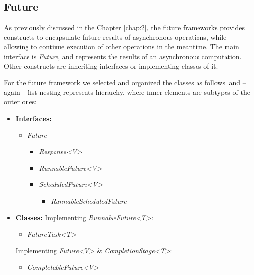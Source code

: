 \documentclass[]{usiinfthesis}
\begin{document}
\subsection{Future}
As previously discussed in the Chapter \ref{chap:2}, the future frameworks provides constructs to encapsulate future results of asynchronous operations, while allowing to continue execution of other operations in the meantime. The main interface is \textit{Future}, and represents the results of an asynchronous computation. Other constructs are inheriting interfaces or implementing classes of it.

\noindent
For the future framework we selected and organized the classes as follows, and -- again -- list nesting represents hierarchy, where inner elements are subtypes of the outer ones:

\begin{itemize}
    \item \textbf{Interfaces:}
    \begin{itemize}
        \item \textit{Future}
        \begin{itemize}
            \item \textit{Response<V>}
            \item \textit{RunnableFuture<V>}
            \item \textit{ScheduledFuture<V>}
            \begin{itemize}
                \item \textit{RunnableScheduledFuture}
            \end{itemize}
        \end{itemize}
    \end{itemize}
    \item \textbf{Classes:}
    \newline
    Implementing \textit{RunnableFuture<T>}:
    \begin{itemize}
        \item \textit{FutureTask<T>}
    \end{itemize}
    Implementing \textit{Future<V>} \& \textit{CompletionStage<T>}:
    \begin{itemize}
        \item \textit{CompletableFuture<V>}
    \end{itemize}
\end{itemize}
\end{document}
